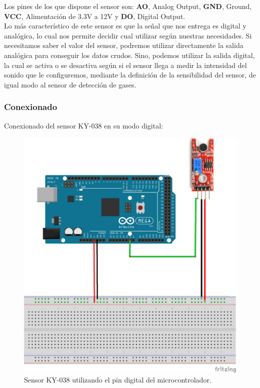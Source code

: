 Los pines de los que dispone el sensor son: \textbf{AO}, Analog Output, \textbf{GND}, Ground, \textbf{VCC}, Alimentación de 3.3V a 12V y \textbf{DO}, Digital Output.\\

Lo más característico de este sensor es que la señal que nos entrega es digital y analógica, lo cual nos permite decidir cual utilizar según nuestras necesidades.
Si necesitamos saber el valor del sensor, podremos utilizar directamente la salida analógica para conseguir los datos crudos. Sino, podemos utilizar la salida digital, la cual
se activa o se desactiva según si el sensor llega a medir la intensidad del sonido que le configuremos, mediante la definición de la sensibilidad del sensor, de igual modo al sensor de detección de gases. \\

\subsubsection{Conexionado}

Conexionado del sensor KY-038 en su modo digital:

\begin{figure}[H]
  \begin{center}
    \includegraphics[scale=0.5]{imagenes/micro_conexionado.png}
  \end{center}
  \caption{Sensor KY-038 utilizando el pin digital del microcontrolador.}
  \label{figura:mq_2_conexionado}
\end{figure}


